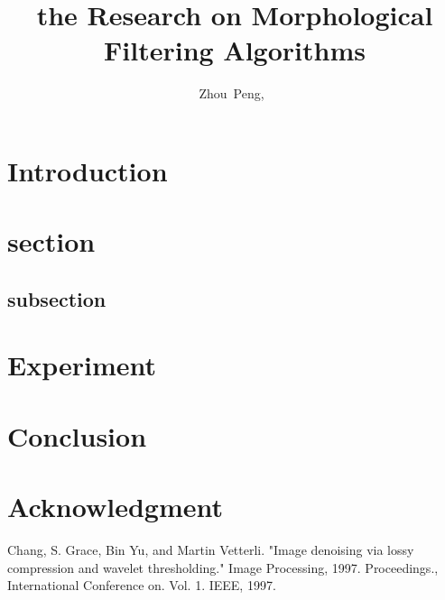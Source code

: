 \documentclass[journal,comsoc]{IEEEtran}
\begin{document}
\title{the Research on Morphological Filtering Algorithms}
\author{Zhou~Peng,~}
\maketitle

\begin{abstract}

\end{abstract}

\begin{IEEEkeywords}

\end{IEEEkeywords}

\section{Introduction}



\section{section}
\label{sec:section}

\subsection{subsection}
\label{subsec:subsection}

\section{Experiment}
\label{sec:experiment}

\section{Conclusion}

\section*{Acknowledgment}


\begin{thebibliography}{1}
  Chang, S. Grace, Bin Yu, and Martin Vetterli. "Image denoising via lossy compression and wavelet thresholding."
  Image Processing, 1997. Proceedings., International Conference on. Vol. 1. IEEE, 1997.

\end{thebibliography}



\vfill
\end{document}
